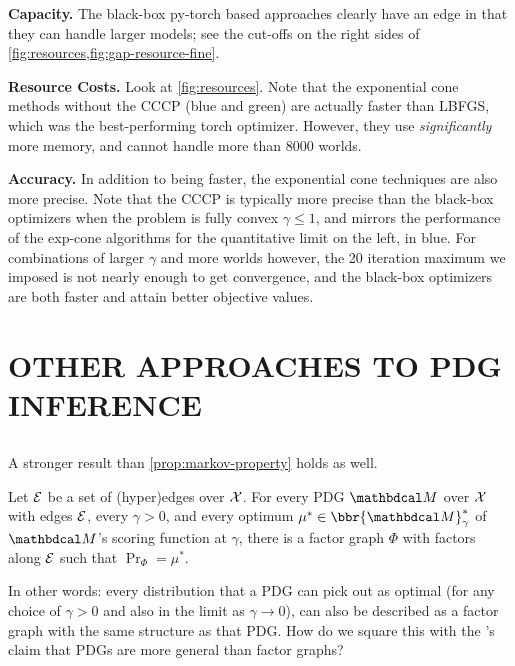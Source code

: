 \documentclass[twoside]{article}
\begin{document}
\textbf{Capacity.}
The black-box py-torch based approaches clearly have an edge in that they can handle larger models; see the cut-offs on the right sides of \cref{fig:resources,fig:gap-resource-fine}.

\textbf{Resource Costs.}
Look at \cref{fig:resources}.
Note that the exponential cone methods without the CCCP (blue and green) are actually faster than LBFGS, which was the best-performing torch optimizer.
However, they use \emph{significantly} more memory, and cannot handle more than 8000 worlds.


\textbf{Accuracy.}
In addition to being faster, the exponential cone techniques are also more precise.
Note that the CCCP is typically more precise than the black-box optimizers when the problem is fully convex $\gamma \le 1$, and mirrors the performance of the exp-cone algorithms for the quantitative limit on the left, in blue.  For combinations of larger $\gamma$ and more worlds however, the 20 iteration maximum we imposed is not nearly enough to get convergence, and the black-box optimizers are both faster and attain better objective values.



\section{OTHER APPROACHES TO PDG INFERENCE} \label{sec:other-inference}

\subsection{}
A stronger result than \cref{prop:markov-property} holds as well.
\begin{prop}\label{prop:same-set-dists}
    Let $\mathcal E$ be a set of (hyper)edges over $\mathcal X$.
    For every PDG $\dg M$ over $\mathcal X$ with edges $\mathcal E$, every $\gamma > 0$, and every optimum $\mu^* \in \bbr{\dg M}_\gamma^*$ of $\dg M$'s scoring function at $\gamma$,
    there is a factor graph $\Phi$ with factors along $\mathcal E$ such that $\Pr_\Phi = \mu^*$.
\end{prop}

In other words: every distribution that a PDG can pick out as optimal (for any choice of $\gamma > 0$ and also in the limit as $\gamma \to 0$), can also be described as a factor graph with the same structure as that PDG.
How do we square this with the \citeauthor{pdg-aaai}'s claim that PDGs are more general than factor graphs?
\end{document}
